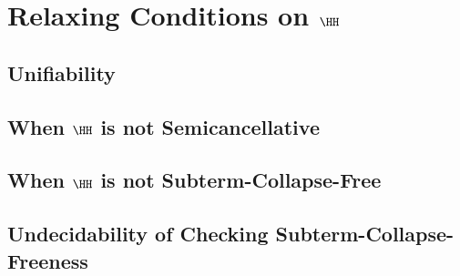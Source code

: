 \chapter{Relaxing Conditions on \texorpdfstring{$\HH$}{H}}\label{chap:relax-cond-h}

\section{Unifiability}\label{sec:unifiability}

\section{When \texorpdfstring{$\HH$}{H} is not Semicancellative}\label{sec:h-not-semicancel}

\section{When \texorpdfstring{$\HH$}{H} is not Subterm-Collapse-Free}\label{sec:h-not-scf}

\section{Undecidability of Checking Subterm-Collapse-Freeness}\label{sec:undec-scf}

